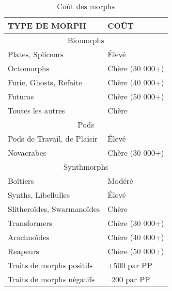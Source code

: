 \begin{table} \caption{Coût des morphs} \begin{tabular}{|l|l|} \hline

TYPE DE MORPH &COÛT \\ \hline

\multicolumn{2}{|c|}{Biomorphs} \\ \hline

Plates, Spliceurs &Élevé \\ \hline

Octomorphs &Chère (30 000+) \\ \hline

Furie, Ghosts, Refaite &Chère (40 000+) \\ \hline

Futuras &Chère (50 000+) \\ \hline

Toutes les autres &Chère \\ \hline

\multicolumn{2}{|c|}{Pods} \\ \hline

Pods de Travail, de Plaisir &Élevé \\ \hline

Novacrabes &Chère (30 000+) \\ \hline

\multicolumn{2}{|c|}{Synthmorphs} \\ \hline

Boîtiers &Modéré \\ \hline

Synths, Libellulles &Élevé \\ \hline

Slitheroïdes, Swarmanoïdes &Chère \\ \hline

Transformers &Chère (30 000+) \\ \hline

Arachnoïdes &Chère (40 000+) \\ \hline

Reapeurs &Chère (50 000+) \\ \hline

Traits de morphs positifs &+500 par PP \\ \hline

Traits de morphs négatifs &–200 par PP \\ \hline

\end{tabular} \label{table:morph-costs} \end{table} 

